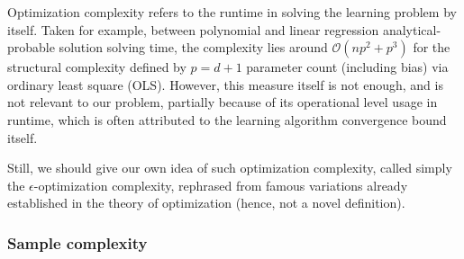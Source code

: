 \documentclass[10pt]{article}
\begin{document}
Optimization complexity refers to the runtime in solving the learning problem by itself. Taken for example, between polynomial and linear regression analytical-probable solution solving time, the complexity lies around $\mathcal{O}(np^{2}+p^{3})$ for the structural complexity defined by $p=d+1$ parameter count (including bias) via ordinary least square (OLS). However, this measure itself is not enough, and is not relevant to our problem, partially because of its operational level usage in runtime, which is often attributed to the learning algorithm convergence bound itself. 

Still, we should give our own idea of such optimization complexity, called simply the $\epsilon$-optimization complexity, rephrased from famous variations already established in the theory of optimization (hence, not a novel definition). 

\subsubsection{Sample complexity}
\end{document}
